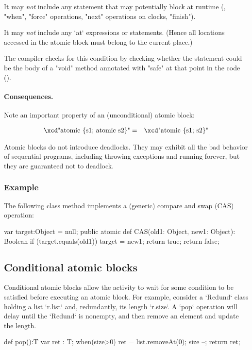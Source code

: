It may {\em not} include any statement that may potentially block at
runtime (\eg, \xcd"when", \xcd"force" operations, \xcd"next"
operations on clocks, \xcd"finish"). 

It may {\em not} include any \xcd`at` expressions or
statements. (Hence all locations accessed in the atomic block must
belong to the current place.)


The compiler checks for this condition by checking whether the statement
could be the body of a \xcd"void" method annotated with \xcd"safe" at
that point in the code ().

\paragraph{Consequences.}
Note an important property of an (unconditional) atomic block:

\begin{eqnarray}
 \mbox{\xcd"atomic \{s1; atomic s2\}"} &=& \mbox{\xcd"atomic \{s1; s2\}"}
\end{eqnarray}

Atomic blocks do not introduce deadlocks.    They may exhibit all the bad
behavior of sequential programs, including throwing exceptions and running
forever, but they are guaranteed not to deadlock.


\subsubsection{Example}

The following class method implements a (generic) compare and swap (CAS) operation:


\begin{xten}
var target:Object = null;
public atomic def CAS(old1: Object, new1: Object): Boolean {
   if (target.equals(old1)) {
     target = new1;
     return true;
   }
   return false;
}
\end{xten}

\subsection{Conditional atomic blocks}

Conditional atomic blocks allow the activity to wait for some condition to be
satisfied before executing an atomic block. For example, consider a
\xcd`Redund` class holding a list \xcd`r.list` and, redundantly, its length
\xcd`r.size`.  A \xcd`pop` operation will delay until the \xcd`Redund` is
nonempty, and then remove an element and update the length.  
\begin{xten}
def pop():T {
  var ret : T;
  when(size>0) {
    ret = list.removeAt(0);
    size --;
    }
  return ret;
}
\end{xten}


